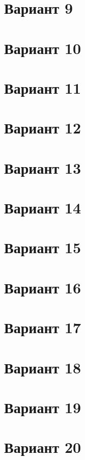 \documentclass[12pt]{article}
\begin{document}
\section{Вариант 9}

\section{Вариант 10}

\section{Вариант 11}

\section{Вариант 12}

\section{Вариант 13}

\section{Вариант 14}

\section{Вариант 15}

\section{Вариант 16}

\section{Вариант 17}

\section{Вариант 18}

\section{Вариант 19}

\section{Вариант 20}
\end{document}
